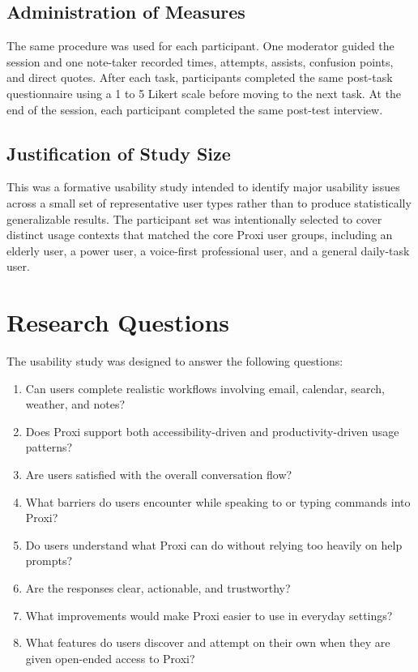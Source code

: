 \documentclass[12pt, titlepage]{article}
\begin{document}
\subsection{Administration of Measures}

The same procedure was used for each participant. One moderator guided
the session and one note-taker recorded times, attempts, assists,
confusion points, and direct quotes. After each task, participants
completed the same post-task questionnaire using a 1 to 5 Likert scale
before moving to the next task. At the end of the session, each
participant completed the same post-test interview.

\subsection{Justification of Study Size}

This was a formative usability study intended to identify major
usability issues across a small set of representative user types rather
than to produce statistically generalizable results. The participant set
was intentionally selected to cover distinct usage contexts that matched
the core Proxi user groups, including an elderly user, a power user, a
voice-first professional user, and a general daily-task user.

\section{Research Questions}

The usability study was designed to answer the following questions:

\begin{enumerate}[label=\arabic*.]
    \item Can users complete realistic workflows involving email,
    calendar, search, weather, and notes?
    \item Does Proxi support both accessibility-driven and
    productivity-driven usage patterns?
    \item Are users satisfied with the overall conversation flow?
    \item What barriers do users encounter while speaking to or typing
    commands into Proxi?
    \item Do users understand what Proxi can do without relying too
    heavily on help prompts?
    \item Are the responses clear, actionable, and trustworthy?
    \item What improvements would make Proxi easier to use in everyday
    settings?
    \item What features do users discover and attempt on their own when
    they are given open-ended access to Proxi?
\end{enumerate}
\end{document}

